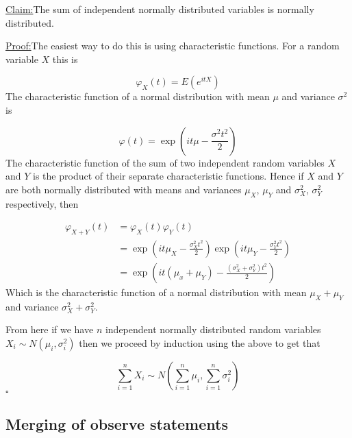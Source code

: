\documentclass[a4paper]{article}
\renewcommand{\qed}{\hfill\ensuremath{\square}}
\newenvironment{claim}[1]{\par\noindent\underline{Claim:}\space#1}{}
\newenvironment{claimproof}[1]{\par\noindent\underline{Proof:}\space#1}{\qed}
\begin{document}
\begin{mdframed}
	\begin{claim}
	  The sum of independent normally distributed variables is normally distributed.
	\end{claim}
	\begin{claimproof}
	  The easiest way to do this is using characteristic functions. For a random variable \(X\) this is

	  \[\varphi_X(t) = E(e^{itX})\]
	  The characteristic function of a normal distribution with mean \(\mu\) and variance \(\sigma^2\) is

	  \[\varphi(t) = \exp(i t \mu - \frac{\sigma^2 t^2}{2})\]
	  The characteristic function of the sum of two independent random variables \(X\) and \(Y\) is the product of their separate characteristic functions. Hence if \(X\) and \(Y\) are both normally distributed with means and variances \(\mu_X\), \(\mu_Y\) and \(\sigma_X^2\), \(\sigma_Y^2\) respectively, then

  	\begin{align*}
  		\varphi_{X+Y}(t)
  		& = \varphi_X(t) \varphi_Y(t) \\
  		& = \exp\left(i t \mu_X - \frac{\sigma_X^2 t^2}{2}\right) \exp\left(i t \mu_Y - \frac{\sigma_Y^2 t^2}{2}\right) \\
  		& = \exp\left(i t (\mu_x + \mu_Y) - \frac{(\sigma_X^2 + \sigma_Y^2) t^2}{2}\right)
  	\end{align*}
	  Which is the characteristic function of a normal distribution with mean \(\mu_X + \mu_Y\) and variance \(\sigma_X^2 + \sigma_Y^2\).

	  From here if we have \(n\) independent normally distributed random variables \(X_i \sim N(\mu_i, \sigma_i^2)\) then we proceed by induction using the above to get that

	  \[\sum_{i=1}^n X_i \sim N(\sum_{i=1}^n \mu_i, \sum_{i=1}^n \sigma_i^2)\]
	\end{claimproof}
\end{mdframed}




\subsection{Merging of observe statements}
\end{document}
